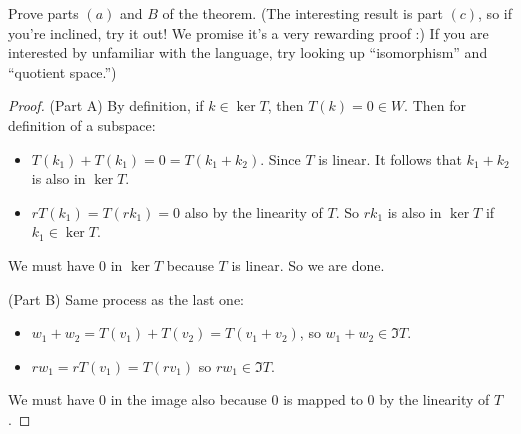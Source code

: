 \documentclass{article}
\begin{document}
Prove parts $(a)$ and $B$ of the theorem. (The interesting result is part $(c)$, so if you're inclined, try it out! We promise it's a very rewarding proof :) If you are interested by unfamiliar with the language, try looking up ``isomorphism'' and ``quotient space.'')
    \begin{proof}
        (Part A) By definition, if $k \in \ker{T}$, then $T(k) = 0 \in W$. Then for definition of a subspace:
            \begin{itemize}
                \item $T(k_{1}) + T(k_{1}) = 0 = T(k_{1} + k_{2})$. Since $T$ is linear. It follows that $k_{1} + k_{2}$ is also in $\ker{T}$.

                \item $rT(k_{1}) = T(rk_{1}) = 0$ also by the linearity of $T$. So $rk_{1}$ is also in $\ker{T}$ if $k_{1} \in \ker{T}$.
            \end{itemize}
        We must have $0$ in $\ker{T}$ because $T$ is linear. So we are done.

        (Part B) Same process as the last one:
            \begin{itemize}
                \item $w_{1} + w_{2} = T(v_{1}) + T(v_{2}) = T(v_{1} + v_{2})$, so $w_{1} + w_{2} \in \Im{T}$.

                \item $rw_{1} = rT(v_{1}) = T(rv_{1})$ so $rw_{1} \in \Im{T}$.
            \end{itemize}
        We must have $0$ in the image also because $0$ is mapped to $0$ by the linearity of $T$.


\end{proof}
\end{document}

